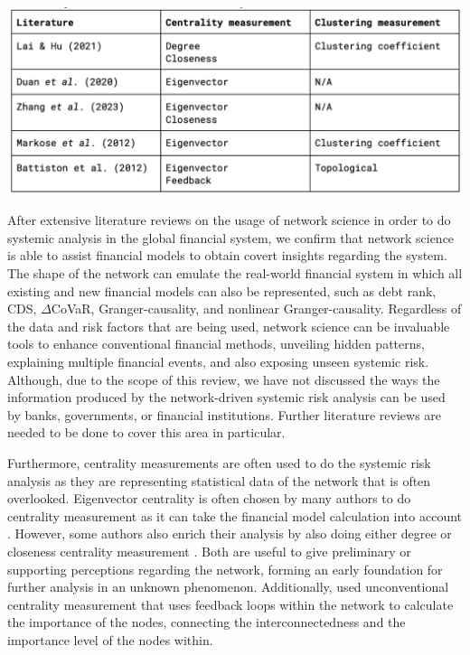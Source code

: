 \documentclass[a4paper,11pt]{article}
\begin{document}
\includegraphics[scale=0.5]{comparison_2.png}

After extensive literature reviews on the usage of network science in order to do systemic analysis in the global financial system, we confirm that network science is able to assist financial models to obtain covert insights regarding the system. The shape of the network can emulate the real-world financial system in which all existing and new financial models can also be represented, such as debt rank, CDS, $\Delta$CoVaR, Granger-causality, and nonlinear Granger-causality. Regardless of the data and risk factors that are being used, network science can be invaluable tools to enhance conventional financial methods, unveiling hidden patterns, explaining multiple financial events, and also exposing unseen systemic risk. Although, due to the scope of this review, we have not discussed the ways the information produced by the network-driven systemic risk analysis can be used by banks, governments, or financial institutions. Further literature reviews are needed to be done to cover this area in particular.

Furthermore, centrality measurements are often used to do the systemic risk analysis as they are representing statistical data of the network that is often overlooked. Eigenvector centrality is often chosen by many authors to do centrality measurement as it can take the financial model calculation into account \citep{Battiston_Puliga_Kaushik_Tasca_Caldarelli_2012, Duan_El_Ghoul_Guedhami_Li_Li_2020, Markose_Giansante_Shaghaghi_2012, Zhang_Yin_Sha_2023}. However, some authors also enrich their analysis by also doing either degree or closeness centrality measurement \citep{Lai_Hu_2021, Zhang_Yin_Sha_2023}. Both are useful to give preliminary or supporting perceptions regarding the network, forming an early foundation for further analysis in an unknown phenomenon. Additionally, \cite{Battiston_Puliga_Kaushik_Tasca_Caldarelli_2012} used unconventional centrality measurement that uses feedback loops within the network to calculate the importance of the nodes, connecting the interconnectedness and the importance level of the nodes within. 
\end{document}
